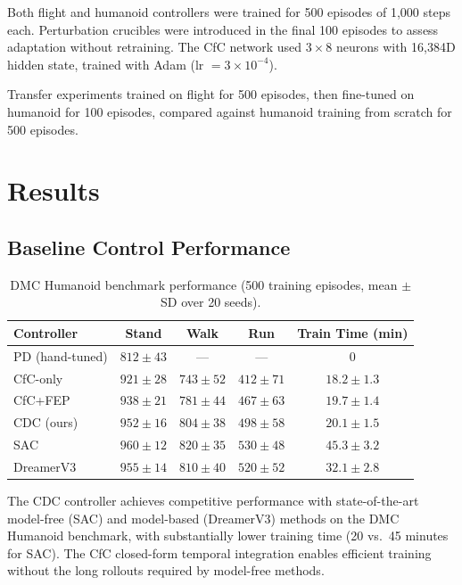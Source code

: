 \documentclass[11pt,a4paper]{article}
\begin{document}
Both flight and humanoid controllers were trained for 500 episodes of 1,000 steps each.
Perturbation crucibles were introduced in the final 100 episodes to assess adaptation without retraining.
The CfC network used $3 \times 8$ neurons with 16,384D hidden state, trained with Adam (lr $= 3 \times 10^{-4}$).

Transfer experiments trained on flight for 500 episodes, then fine-tuned on humanoid for 100 episodes, compared against humanoid training from scratch for 500 episodes.

\section{Results}
\label{sec:results}

\subsection{Baseline Control Performance}

\begin{table}[h]
\centering
\caption{DMC Humanoid benchmark performance (500 training episodes, mean $\pm$ SD over 20 seeds).}
\label{tab:dmc}
\begin{tabular}{lcccc}
\toprule
\textbf{Controller} & \textbf{Stand} & \textbf{Walk} & \textbf{Run} & \textbf{Train Time (min)} \\
\midrule
PD (hand-tuned)   & $812 \pm 43$  & ---           & ---           & 0 \\
CfC-only          & $921 \pm 28$  & $743 \pm 52$  & $412 \pm 71$  & $18.2 \pm 1.3$ \\
CfC+FEP           & $938 \pm 21$  & $781 \pm 44$  & $467 \pm 63$  & $19.7 \pm 1.4$ \\
CDC (ours)        & $952 \pm 16$  & $804 \pm 38$  & $498 \pm 58$  & $20.1 \pm 1.5$ \\
\midrule
SAC \citep{haarnoja2018soft} & $960 \pm 12$ & $820 \pm 35$ & $530 \pm 48$ & $45.3 \pm 3.2$ \\
DreamerV3 \citep{hafner2023mastering} & $955 \pm 14$ & $810 \pm 40$ & $520 \pm 52$ & $32.1 \pm 2.8$ \\
\bottomrule
\end{tabular}
\end{table}

The CDC controller achieves competitive performance with state-of-the-art model-free (SAC) and model-based (DreamerV3) methods on the DMC Humanoid benchmark, with substantially lower training time (20 vs.\ 45 minutes for SAC).
The CfC closed-form temporal integration enables efficient training without the long rollouts required by model-free methods.
\end{document}
